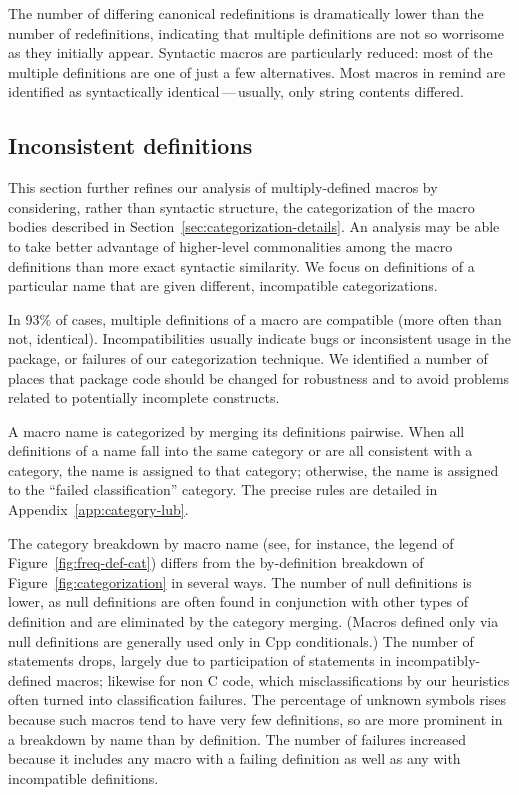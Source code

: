 \documentclass[10pt]{article}
\newcommand{\pkg}[1]{\textsf{#1}}
\begin{document}
The number of differing canonical redefinitions is dramatically lower than
the number of redefinitions, indicating that multiple definitions are not
so worrisome as they initially appear.  Syntactic macros are particularly
reduced: most of the multiple definitions are one of just a few
alternatives.  Most macros in \pkg{remind} are identified as syntactically
identical\,---\,usually, only string contents differed.


\subsection{Inconsistent definitions}
\label{sec:inconsistent}


This section further refines our analysis of multiply-defined macros by
considering, rather than syntactic structure, the categorization of the
macro bodies described in Section~\ref{sec:categorization-details}.  An
analysis may be able to take better advantage of higher-level commonalities
among the macro definitions than more exact syntactic similarity.  We focus
on definitions of a particular name that are given different, incompatible
categorizations.


In 93\% of cases, multiple definitions of a macro are compatible (more
often than not, identical).  Incompatibilities usually indicate bugs or
inconsistent usage in the package, or failures of our categorization
technique.  We identified a number of places that package code should be
changed for robustness and to avoid problems related to potentially
incomplete constructs.

A macro name is categorized by merging its definitions pairwise.  When all
definitions of a name fall into the same category or are all consistent
with a category, the name is assigned to that category; otherwise, the name
is assigned to the ``failed classification'' category.  The precise rules
are detailed in Appendix~\ref{app:category-lub}.

The category breakdown by macro name (see, for instance, the legend of
Figure~\ref{fig:freq-def-cat}) differs from the by-definition breakdown of
Figure~\ref{fig:categorization} in several ways.  The number of null
definitions is lower, as null definitions are often found in conjunction
with other types of definition and are eliminated by the category merging.
(Macros defined only via null definitions are generally used only in Cpp
conditionals.)  The number of statements drops, largely due to
participation of statements in incompatibly-defined macros; likewise for
non C code, which misclassifications by our heuristics often turned into
classification failures.  The percentage of unknown symbols rises because
such macros tend to have very few definitions, so are more prominent in a
breakdown by name than by definition.  The number of failures increased
because it includes any macro with a failing definition as well as any with
incompatible definitions.
\end{document}
